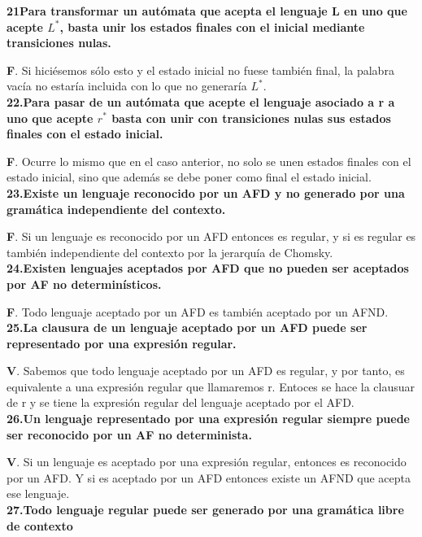 \documentclass[a4paper,11pt]{article}
\begin{document}
\textbf{21Para transformar un autómata que acepta el lenguaje L en uno que acepte $L^*$, basta unir los estados finales con el inicial mediante transiciones nulas.}

\textbf{F}. Si hiciésemos sólo esto y el estado inicial no fuese también final, la palabra vacía no estaría incluida con lo que no generaría $L^*$. \\

\textbf{22.Para pasar de un autómata que acepte el lenguaje asociado a r a uno que acepte $r^*$ basta con unir con transiciones nulas sus estados finales con el estado inicial.}

\textbf{F}. Ocurre lo mismo que en el caso anterior, no solo se unen estados finales con el estado inicial, sino que además se debe poner como final el estado inicial. \\

\textbf{23.Existe un lenguaje reconocido por un AFD y no generado por una gramática independiente del contexto.}

\textbf{F}. Si un lenguaje es reconocido por un AFD entonces es regular, y si es regular es también independiente del contexto por la jerarquía de Chomsky. \\

\textbf{24.Existen lenguajes aceptados por AFD que no pueden ser aceptados por AF no determinísticos.}

\textbf{F}. Todo lenguaje aceptado por un AFD es también aceptado por un AFND. \\

\textbf{25.La clausura de un lenguaje aceptado por un AFD puede ser representado por una expresión regular.}

\textbf{V}. Sabemos que todo lenguaje aceptado por un AFD es regular, y por tanto, es equivalente a una expresión regular que llamaremos r. Entoces se hace la clausuar de r y se tiene la expresión regular del lenguaje aceptado por el AFD. \\

\textbf{26.Un lenguaje representado por una expresión regular siempre puede ser reconocido por un AF no determinista.}

\textbf{V}. Si un lenguaje es aceptado por una expresión regular, entonces es reconocido por un AFD. Y si es aceptado por un AFD entonces existe un AFND que acepta ese lenguaje. \\

\textbf{27.Todo lenguaje regular puede ser generado por una gramática libre de contexto}
\end{document}
